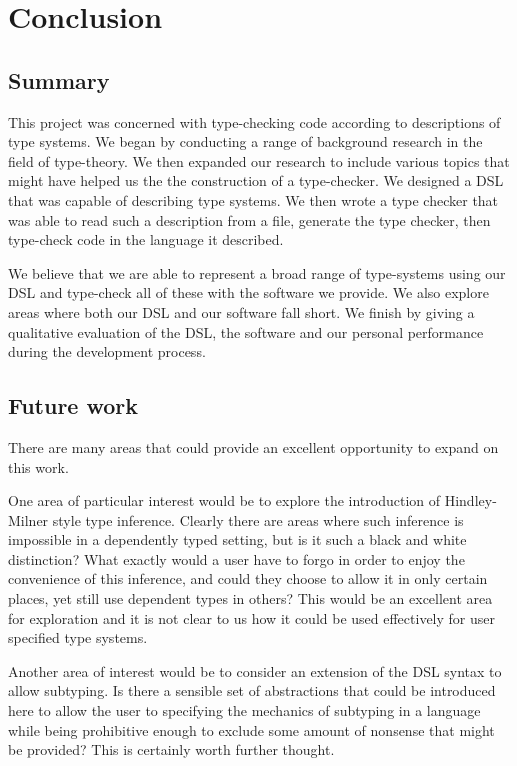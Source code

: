 \chapter{Conclusion}

\section{Summary}

This project was concerned with type-checking code according to
descriptions of type systems. We began
by conducting a range of background research in the field of
type-theory. We then expanded our research to include various topics
that might have helped us the the construction of a type-checker. We
designed a DSL that was capable of describing type systems. We then
wrote a type checker that was able to read such a description from a 
file, generate the type checker, then type-check code in the language it
described.

We believe that we are able to represent a broad range of
type-systems using our DSL and type-check all of these with the software we
provide. We also explore areas where both our DSL and our software
fall short. We finish by giving a qualitative evaluation of the DSL,
the software and our personal performance during the development
process. 

\section{Future work}

There are many areas that could provide an excellent opportunity to
expand on this work.

One area of particular interest would be to explore the introduction
of Hindley-Milner style type inference. Clearly there are areas where
such inference is impossible in a dependently typed setting, but is it
such a black and white distinction? What exactly would a user have to
forgo in order to enjoy the convenience of this inference, and could
they choose to allow it in only certain places, yet still use
dependent types in others? This would be an excellent area for
exploration and it is not clear to us how it could be used effectively
for user specified type systems.

Another area of interest would be to consider an extension of the DSL
syntax to allow subtyping. Is there a sensible set of abstractions
that could be introduced here to allow the user to specifying the
mechanics of subtyping in a language while being prohibitive enough to
exclude some amount of nonsense that might be provided? This is
certainly worth further thought.

